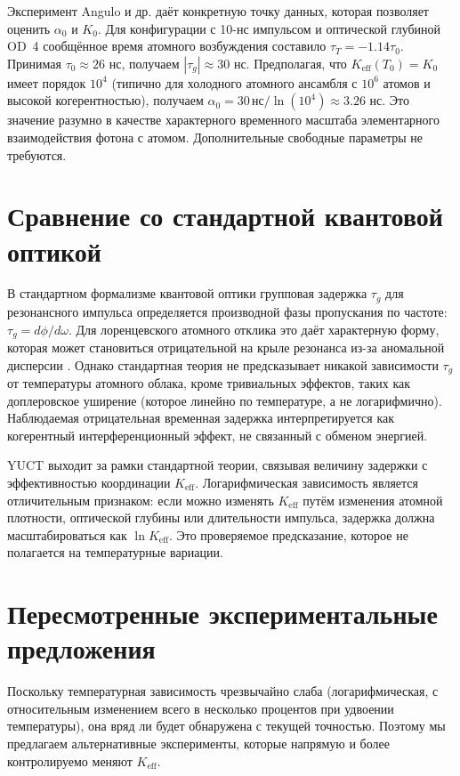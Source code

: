 \documentclass[12pt,a4paper]{article}
\newcommand{\Keff}{K_{\mathrm{eff}}}
\begin{document}
	Эксперимент Angulo и др. \cite{Angulo2024} даёт конкретную точку данных, которая позволяет оценить \(\alpha_0\) и \(K_0\). Для конфигурации с 10-нс импульсом и оптической глубиной OD~4 сообщённое время атомного возбуждения составило \(\tau_T = -1.14 \tau_0\). Принимая \(\tau_0 \approx 26\) нс, получаем \(|\tau_g| \approx 30\) нс. Предполагая, что \(\Keff(T_0) = K_0\) имеет порядок \(10^4\) (типично для холодного атомного ансамбля с \(10^6\) атомов и высокой когерентностью), получаем \(\alpha_0 = 30\,\text{нс} / \ln(10^4) \approx 3.26\) нс. Это значение разумно в качестве характерного временного масштаба элементарного взаимодействия фотона с атомом. Дополнительные свободные параметры не требуются.
	
	\section{Сравнение со стандартной квантовой оптикой}
	
	В стандартном формализме квантовой оптики групповая задержка \(\tau_g\) для резонансного импульса определяется производной фазы пропускания по частоте: \(\tau_g = d\phi/d\omega\). Для лоренцевского атомного отклика это даёт характерную форму, которая может становиться отрицательной на крыле резонанса из-за аномальной дисперсии \cite{Milonni2004}. Однако стандартная теория не предсказывает никакой зависимости \(\tau_g\) от температуры атомного облака, кроме тривиальных эффектов, таких как доплеровское уширение (которое линейно по температуре, а не логарифмично). Наблюдаемая отрицательная временная задержка интерпретируется как когерентный интерференционный эффект, не связанный с обменом энергией.
	
	YUCT выходит за рамки стандартной теории, связывая величину задержки с эффективностью координации \(\Keff\). Логарифмическая зависимость является отличительным признаком: если можно изменять \(\Keff\) путём изменения атомной плотности, оптической глубины или длительности импульса, задержка должна масштабироваться как \(\ln\Keff\). Это проверяемое предсказание, которое не полагается на температурные вариации.
	
	\section{Пересмотренные экспериментальные предложения}
	
	Поскольку температурная зависимость чрезвычайно слаба (логарифмическая, с относительным изменением всего в несколько процентов при удвоении температуры), она вряд ли будет обнаружена с текущей точностью. Поэтому мы предлагаем альтернативные эксперименты, которые напрямую и более контролируемо меняют \(\Keff\).
	
\end{document}
